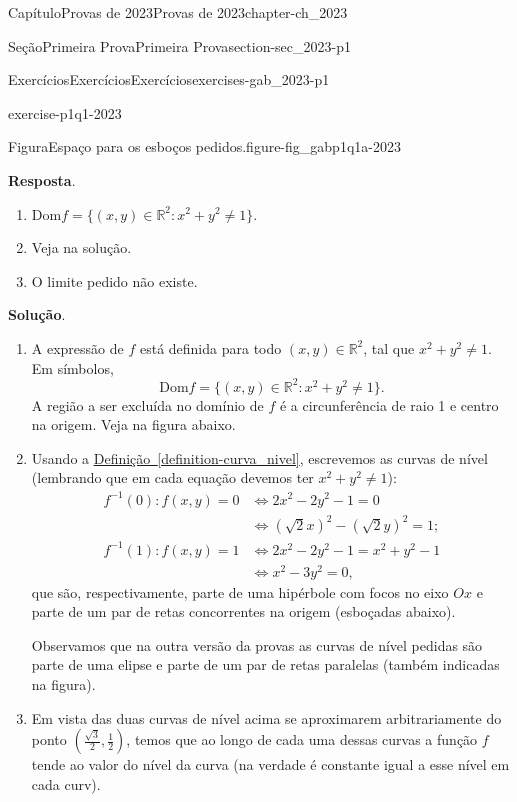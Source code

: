 \documentclass[oneside,10pt,]{book}
\newcommand{\blocktitlefont}{\relax}
\newcommand{\xreffont}{\relax}
\numberwithin{equation}{section}
\newcommand{\R}{\mathbb R}
\begin{document}
\begin{chapterptx}{Capítulo}{Provas de 2023}{}{Provas de 2023}{}{}{chapter-ch_2023}
\begin{sectionptx}{Seção}{Primeira Prova}{}{Primeira Prova}{}{}{section-sec_2023-p1}
\begin{exercises-subsection-numberless}{Exercícios}{Exercícios}{}{Exercícios}{}{}{exercises-gab_2023-p1}
\begin{divisionexercise}{1}{}{}{exercise-p1q1-2023}
\begin{figureptx}{Figura}{Espaço para os esboços pedidos.}{figure-fig_gabp1q1a-2023}{}
\begin{image}{0.25}{0.5}{0.25}{}
{}%
\end{image}%
\tcblower
\end{figureptx}%
%
\par\smallskip%
\noindent\textbf{\blocktitlefont Resposta}.\hypertarget{answer-p1q1-2023-b}{}\quad{}%
\begin{enumerate}[label=\alph*]
\item{}\(\mathrm{Dom} f=\big\{(x,y)\in\R^2\colon x^2+y^2\neq 1\big\}\).%
\item{}Veja na solução.%
\item{}O limite pedido não existe.%
\end{enumerate}
%
\par\smallskip%
\noindent\textbf{\blocktitlefont Solução}.\hypertarget{solution-p1q1-2023-c}{}\quad{}%
\begin{enumerate}[label=\alph*]
\item{}A expressão de \(f\) está definida para todo \((x,y)\in\R^2\), tal que \(x^2+y^2\neq 1\). Em símbolos,%
\begin{equation*}
\mathrm{Dom} f=\big\{(x,y)\in\R^2\colon x^2+y^2\neq
1\big\}.
\end{equation*}
A região a ser excluída no domínio de \(f\) é a circunferência de raio 1 e centro na origem. Veja na figura abaixo.%
\item{}Usando a \hyperref[definition-curva_nivel]{Definição~{\xreffont\ref{definition-curva_nivel}}}, escrevemos as curvas de nível (lembrando que em cada equação devemos ter \(x^2+y^2\neq 1\)):%
\begin{align*}
f^{-1}(0)\colon f(x,y)=0&\iff
2x^2-2y^2-1=0\\
&\iff (\sqrt{2}x)^2-(\sqrt{2}y)^2=1;\\
f^{-1}(1)\colon f(x,y)=1&\iff
2x^2-2y^2-1=x^2+y^2-1\\
&\iff x^2-3y^2=0,
\end{align*}
que são, respectivamente, parte de uma hipérbole com focos no eixo \(Ox\) e parte de um par de retas concorrentes na origem (esboçadas abaixo).%
\par
Observamos que na outra versão da provas as curvas de nível pedidas são parte de uma elipse e parte de um par de retas paralelas (também indicadas na figura).%
\item{}Em vista das duas curvas de nível acima se aproximarem arbitrariamente do ponto \((\frac{\sqrt{3}}{2},\frac{1}{2})\), temos que ao longo de cada uma dessas curvas a função \(f\) tende ao valor do nível da curva (na verdade é constante igual a esse nível em cada curv).%
\par

\end{enumerate}
\end{divisionexercise}
\end{exercises-subsection-numberless}
\end{sectionptx}
\end{chapterptx}
\end{document}
